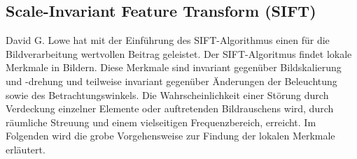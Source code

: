 \subsection{Scale-Invariant Feature Transform (SIFT)}
David G. Lowe hat mit der Einführung des SIFT-Algorithmus einen für die
Bildverarbeitung wertvollen Beitrag geleistet. Der SIFT-Algoritmus findet lokale
Merkmale in Bildern. Diese Merkmale sind invariant gegenüber Bildskalierung und
-drehung und teilweise invariant gegenüber Änderungen der Beleuchtung sowie des
Betrachtungswinkels. Die Wahrscheinlichkeit einer Störung durch Verdeckung
einzelner Elemente oder auftretenden Bildrauschens wird, durch räumliche
Streuung und einem vielseitigen Frequenzbereich, erreicht. Im Folgenden wird die
grobe Vorgehensweise zur Findung der lokalen Merkmale erläutert.
\parencite{sift-distinctive-features}

